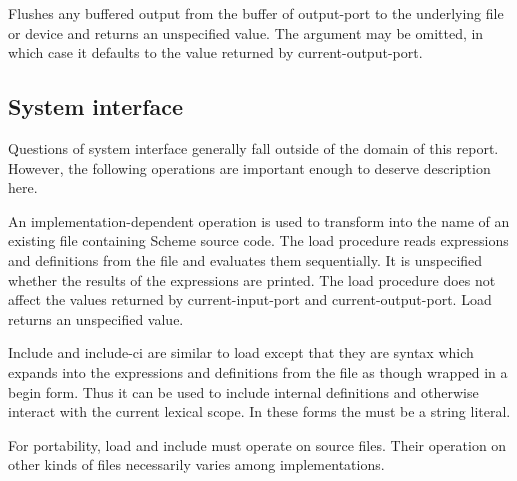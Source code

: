 \begin{entry}{%
}

Flushes any buffered output from the buffer of output-port to the
underlying file or device and returns an unspecified value.
The  argument may be omitted, in which case it defaults to
the value returned by {\cf current-output-port}.

\end{entry}


\subsection{System interface}

Questions of system interface generally fall outside of the domain of this
report.  However, the following operations are important enough to
deserve description here.


\begin{entry}{%
}


An implementation-dependent operation is used to transform
 into the name of an existing file
containing Scheme source code.  The {\cf load} procedure reads
expressions and definitions from the file and evaluates them
sequentially.  It is unspecified whether the results of the expressions
are printed.  The {\cf load} procedure does not affect the values
returned by {\cf current-input-port} and {\cf current-output-port}.
{\cf Load} returns an unspecified value.

\end{entry}

\begin{entry}{%
}

{\cf Include} and {\cf include-ci} are similar to {\cf load} except
that they are syntax which expands into the expressions and
definitions from the file as though wrapped in a {\cf begin} form.
Thus it can be used to include internal definitions and otherwise
interact with the current lexical scope.  In these forms the
 must be a string literal.

\begin{rationale}
For portability, {\cf load} and {\cf include} must operate on source files.
Their operation on other kinds of files necessarily varies among
implementations.
\end{rationale}
\end{entry}

